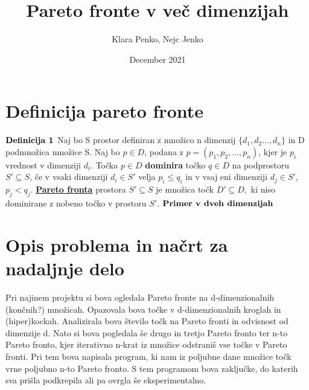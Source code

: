\documentclass{article}
\title{Pareto fronte v več dimenzijah}
\author{Klara Penko, Nejc Jenko}
\date{December 2021}
\begin{document}
\begin{titlepage}
    \maketitle
\end{titlepage}

\section{Definicija pareto fronte}
${\rm \textbf{Definicija 1}}$ Naj bo S prostor definiran z množico n dimenzij $\{d_{1},d_{2}\dots,d_{n}\}$ in D podmnožica množice S. Naj bo $p \in D$, podana z $p = (p_{1},p_{2},\dots,p_{n})$, kjer je $p_{i}$ vrednost v dimenziji $d_{i}$. Točka $p \in D$ \textbf{dominira} točko $q \in D$ na podprostoru $S'\subseteq S$, če v vsaki dimenziji $d_{i} \in S'$ velja $p_{i} \le q_{i}$ in v vsaj eni dimenziji $d_{j} \in S'$, $p_{j} < q_{j}$. 
\underline{\textbf{Pareto fronta}} prostora $S' \subseteq S$ je množica točk $D' \subseteq D,$ ki niso dominirane z nobeno točko v prostoru $S'$. \break
\break
${\rm \textbf{Primer v dveh dimenzijah}}$

 \begin{figure}[htbp]
\centering
\end{figure}

\section{Opis problema in načrt za nadaljnje delo}

Pri najinem projektu si bova ogledala Pareto fronte na d-dimenzionalnih (končnih?) množicah. Opazovala bova točke v d-dimenzionalnih kroglah in (hiper)kockah. Analizirala bova število točk na Pareto fronti in odvisnost od dimenzije d. Nato si bova pogledala še drugo in tretjo Pareto fronto ter n-to Pareto fronto, kjer iterativno n-krat iz množice odstraniš vse točke v Pareto fronti. Pri tem bova napisala program, ki nam iz poljubne dane množice točk vrne poljubno n-to Pareto fronto. S tem programom bova zaključke, do katerih sva prišla podkrepila ali pa ovrgla še eksperimentalno.
\end{document}
